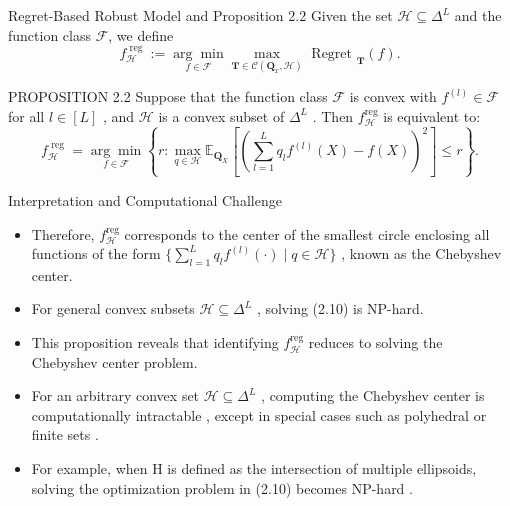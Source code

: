 \documentclass{beamer}
\begin{document}
\begin{frame}{Regret-Based Robust Model and Proposition 2.2}
    Given the set $\mathcal { H } \subseteq \Delta ^ { L }$ and the function class ${ \mathcal { F } }$, we define
    \begin{equation*}
        f _ {\mathcal {H}} ^ {\text { reg }} := \underset {f \in \mathcal {F}} {\arg \min} \underset {\mathbf {T} \in \mathcal {C} (\mathbf {Q} _ {x}, \mathcal {H})} {\max} \text { Regret } _ {\mathbf {T}} (f). \tag {2.9}
    \end{equation*}

    \begin{block}{PROPOSITION 2.2}
        Suppose that the function class $\mathcal { F }$ is convex with $f ^ { ( l ) } \in \mathcal { F }$ for all $l \in [ L ]$ , and $\mathcal { H }$ is a convex subset of $\Delta ^ { L }$ . Then $f _ { \mathcal { H } } ^ { \mathrm { r e g } }$ is equivalent to:
        \begin{equation*}
            f _ {\mathcal {H}} ^ {\text { reg }} = \underset {f \in \mathcal {F}} {\arg \min} \left\{r: \max _ {q \in \mathcal {H}} \mathbb {E} _ {\mathbf {Q} _ {X}} \left[ \left(\sum_ {l = 1} ^ {L} q _ {l} f ^ {(l)} (X) - f (X)\right) ^ {2} \right] \leq r \right\}. \tag {2.10}
        \end{equation*}
    \end{block}
\end{frame}

\begin{frame}{Interpretation and Computational Challenge}
    \begin{itemize}
        \item Therefore, $f _ { \mathcal { H } } ^ { \mathrm { r e g } }$ corresponds to the center of the smallest circle enclosing all functions of the form $\{ \textstyle \sum _ { l = 1 } ^ { L } q _ { l } f ^ { ( l ) } ( \cdot ) \mid q \in \mathcal { H } \}$ , known as the Chebyshev center.
        \item For general convex subsets $\mathcal { H } \subseteq \Delta ^ { L }$ , solving (2.10) is NP-hard.
        \item This proposition reveals that identifying $f _ { \mathcal { H } } ^ { \mathrm { r e g } }$ reduces to solving the Chebyshev center problem.
        \item For an arbitrary convex set $\mathcal { H } \subseteq \Delta ^ { L }$ , computing the Chebyshev center is computationally intractable \cite{17}, except in special cases such as polyhedral \cite{35} or finite sets \cite{66}.
        \item For example, when H is defined as the intersection of multiple ellipsoids, solving the optimization problem in (2.10) becomes NP-hard \cite{64}.
    \end{itemize}
\end{frame}
\end{document}
